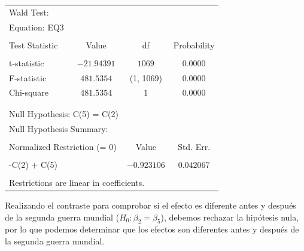 \documentclass[12pt]{article}
\numberwithin{equation}{section} %
\begin{document}
\begin{table}[H]
\centering
\begin{tabular}{lrrr}
\multicolumn{1}{l}{Wald Test:}&\multicolumn{1}{c}{}&\multicolumn{1}{c}{}&\multicolumn{1}{c}{}\\
\multicolumn{2}{l}{Equation: EQ3}&\multicolumn{1}{c}{}&\multicolumn{1}{c}{}\\
[4.5pt] \hline \\ [-4.5pt]
\multicolumn{1}{l}{Test Statistic}&\multicolumn{1}{c}{Value}&\multicolumn{1}{c}{df}&\multicolumn{1}{c}{Probability}\\
[4.5pt] \hline \\ [-4.5pt]
\multicolumn{1}{l}{t-statistic}&\multicolumn{1}{c}{$-21.94391$}&\multicolumn{1}{c}{$1069$}&\multicolumn{1}{c}{$0.0000$}\\
\multicolumn{1}{l}{F-statistic}&\multicolumn{1}{c}{$481.5354$}&\multicolumn{1}{c}{(1, 1069)}&\multicolumn{1}{c}{$0.0000$}\\
\multicolumn{1}{l}{Chi-square}&\multicolumn{1}{c}{$481.5354$}&\multicolumn{1}{c}{$1$}&\multicolumn{1}{c}{$0.0000$}\\
[4.5pt] \hline \\ [-4.5pt]
\multicolumn{1}{c}{}&\multicolumn{1}{c}{}&\multicolumn{1}{c}{}&\multicolumn{1}{c}{}\\
\multicolumn{2}{l}{Null Hypothesis: C(5) = C(2)}&\multicolumn{1}{c}{}&\multicolumn{1}{c}{}\\
\multicolumn{2}{l}{Null Hypothesis Summary:}&\multicolumn{1}{c}{}&\multicolumn{1}{c}{}\\
[4.5pt] \hline \\ [-4.5pt]
\multicolumn{2}{l}{Normalized Restriction (= 0)}&\multicolumn{1}{c}{Value}&\multicolumn{1}{c}{Std. Err.}\\
[4.5pt] \hline \\ [-4.5pt]
\multicolumn{2}{l}{-C(2) + C(5)}&\multicolumn{1}{c}{$-0.923106$}&\multicolumn{1}{c}{$0.042067$}\\
[4.5pt] \hline \\ [-4.5pt]
\multicolumn{3}{l}{Restrictions are linear in coefficients.}&\multicolumn{1}{c}{}\\
\end{tabular}
\end{table}

Realizando el contraste para comprobar si el efecto es diferente antes y después de la segunda guerra mundial ($H_0: \beta_2 = \beta_5$), debemos rechazar la hipótesis nula, por lo que podemos determinar que los efectos son diferentes antes y después de la segunda guerra mundial.
\end{document}
